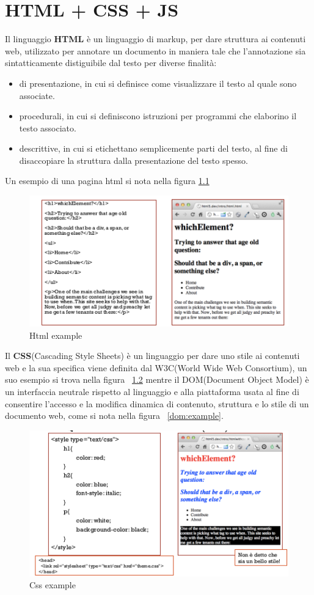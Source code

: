\message{ !name(sd.tex)}\documentclass[a4paper,12pt, oneside]{book}
\begin{document}
\chapter{HTML + CSS + JS}
Il linguaggio \textbf{HTML} è un linguaggio di markup, per dare struttura ai contenuti web,
utilizzato per annotare un documento in maniera tale che l'annotazione sia sintatticamente
distiguibile dal testo per diverse finalità:
\begin{itemize}
    \item di presentazione, in cui si definisce come visualizzare il testo al quale sono associate.
    \item procedurali, in cui si definiscono istruzioni per programmi che elaborino il testo associato.
    \item descrittive, in cui si etichettano semplicemente parti del testo, 
        al fine di disaccopiare la struttura dalla presentazione del testo spesso.
\end{itemize}
Un esempio di una pagina html si nota nella figura \ref{listato:htmlExample}

\begin{figure}
    \caption{Html example}
    \label{listato:htmlExample}
	\includegraphics[scale=0.9]{img/html.png}
\end{figure}
Il \textbf{CSS}(Cascading Style Sheets) è un linguaggio per dare uno stile ai contenuti web e la sua specifica
viene definita dal W3C(World Wide Web Consortium), un suo esempio si trova nella figura ~\ref{css:example}
mentre il DOM(Document Object Model) è un interfaccia neutrale rispetto al linguaggio e alla piattaforma
usata al fine di consentire l'accesso e la modifica dinamica di contenuto, struttura e lo stile di un
documento web, come si nota nella figura ~\ref{dom:example}.

\begin{figure}
    \caption{Css example}
    \label{css:example}
	\includegraphics[scale=0.9]{img/css.png}
\end{figure}
\end{document}
